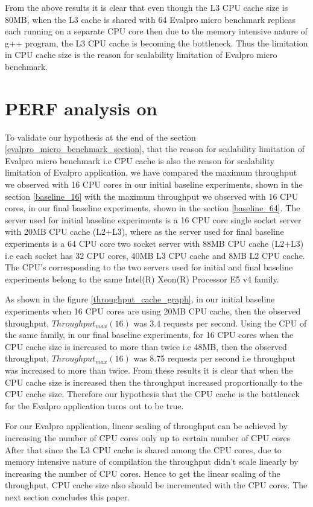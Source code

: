 \documentclass[sigconf]{acmart}
\begin{document}
From the above results it is clear that even though the L3 CPU cache size is 80MB,  when the L3 cache is shared with 64 Evalpro micro benchmark replicas each running on a separate CPU core then due to the memory intensive nature of g++ program, the L3 CPU cache is becoming the bottleneck. Thus the limitation in CPU cache size is the reason for scalability limitation of Evalpro micro benchmark. 


\section{PERF analysis on }

To validate our hypothesis at the end of the section \ref{evalpro_micro_benchmark_section},  that the reason for scalability limitation of Evalpro micro benchmark  i.e  CPU cache is also the reason for scalability limitation of Evalpro application, we have compared the maximum throughput we observed with 16 CPU cores in our initial baseline experiments, shown in the section \ref{baseline_16} with the  maximum throughput we observed with 16 CPU cores, in our final baseline experiments, shown in the section \ref{baseline_64}. The server used for initial baseline experiments is a 16 CPU core single socket server with 20MB CPU cache (L2+L3), where as the server used for final baseline experiments is a 64 CPU core two socket server with 88MB CPU cache (L2+L3)  i.e each socket has 32 CPU cores, 40MB L3 CPU cache and 8MB L2 CPU cache. The CPU's corresponding to the two servers used for initial and final baseline experiments belong to the same Intel(R) Xeon(R) Processor E5 v4 family.

As shown in the figure \ref{throughput_cache_graph}, in our initial baseline experiments  when 16 CPU cores are using 20MB CPU cache, then the observed  throughput, $Throughput_{max}(16)$ was 3.4 requests per second. Using the CPU of the same family, in our final  baseline experiments, for 16 CPU cores when the CPU cache size is increased to more than twice i.e 48MB, then the observed  throughput, $Throughput_{max}(16)$ was 8.75 requests per second i.e throughput was increased to more than twice. From these results it is clear that when the CPU cache size is increased then the throughput increased proportionally to the CPU cache size. Therefore our hypothesis that the  CPU cache is the bottleneck for the Evalpro application turns out to be true.

For our Evalpro application, linear scaling of throughput can be achieved by increasing the number of CPU cores only up to certain number of CPU cores After that since the L3 CPU cache is shared among the CPU cores,  due to memory intensive nature of compilation the throughput didn't scale linearly by increasing the number of CPU cores. Hence to get the linear scaling of the throughput, CPU cache size also should be incremented with the CPU cores. The next section concludes this paper.
\end{document}
